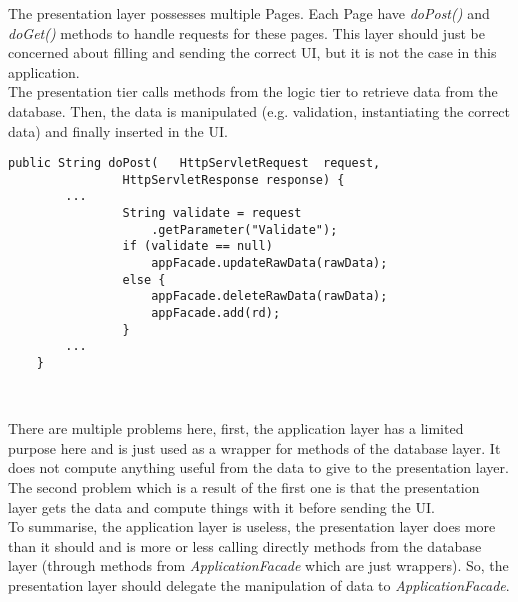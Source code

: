 The presentation layer possesses multiple Pages. Each Page have \emph{doPost()}
and \emph{doGet()} methods to handle requests for these pages. This layer should
just be concerned about filling and sending the correct UI, but it is not the
case in this application.\\

The presentation tier calls methods from the logic tier to retrieve data from
the database. Then, the data is manipulated (e.g. validation, instantiating the
correct data) and finally inserted in the UI.\\

\begin{lstlisting}[caption={data validation in AdministrationPage}]
	public String doPost(	HttpServletRequest	request,
				HttpServletResponse	response) {
		...
				String validate = request
					.getParameter("Validate");
				if (validate == null)
					appFacade.updateRawData(rawData);
				else {
					appFacade.deleteRawData(rawData);
					appFacade.add(rd);
				}
        ...
    }
\end{lstlisting}
\

There are multiple problems here, first, the application layer has a limited
purpose here and is just used as a wrapper for methods of the database layer. It
does not compute anything useful from the data to give to the presentation layer.
The second problem which is a result of the first one is that the presentation
layer gets the data and compute things with it before sending the UI.\\

To summarise, the application layer is useless, the presentation layer does
more than it should and is more or less calling directly methods from the
database layer (through methods from \emph{ApplicationFacade} which are just
wrappers). So, the presentation layer should delegate the manipulation of data
to \emph{ApplicationFacade}.

\newpage
